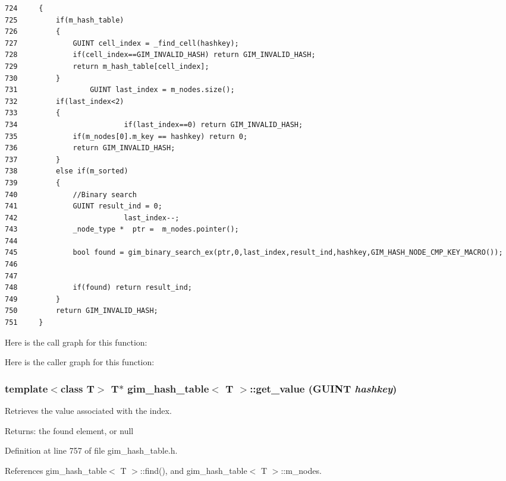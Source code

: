 \begin{Code}\begin{verbatim}724     {
725         if(m_hash_table)
726         {
727             GUINT cell_index = _find_cell(hashkey);
728             if(cell_index==GIM_INVALID_HASH) return GIM_INVALID_HASH;
729             return m_hash_table[cell_index];
730         }
731                 GUINT last_index = m_nodes.size();
732         if(last_index<2)
733         {
734                         if(last_index==0) return GIM_INVALID_HASH;
735             if(m_nodes[0].m_key == hashkey) return 0;
736             return GIM_INVALID_HASH;
737         }
738         else if(m_sorted)
739         {
740             //Binary search
741             GUINT result_ind = 0;
742                         last_index--;
743             _node_type *  ptr =  m_nodes.pointer();
744 
745             bool found = gim_binary_search_ex(ptr,0,last_index,result_ind,hashkey,GIM_HASH_NODE_CMP_KEY_MACRO());
746 
747 
748             if(found) return result_ind;
749         }
750         return GIM_INVALID_HASH;
751     }
\end{verbatim}
\end{Code}




Here is the call graph for this function:

Here is the caller graph for this function:\hypertarget{classgim__hash__table_40b5c46a0117da3948cd1b093f185321}{
\subsubsection[get\_\-value]{\setlength{\rightskip}{0pt plus 5cm}template$<$class T$>$ T$\ast$ {\bf gim\_\-hash\_\-table}$<$ T $>$::get\_\-value (GUINT {\em hashkey})}}
\label{classgim__hash__table_40b5c46a0117da3948cd1b093f185321}


Retrieves the value associated with the index. 

\begin{Desc}
\item[Returns:]the found element, or null \end{Desc}


Definition at line 757 of file gim\_\-hash\_\-table.h.

References gim\_\-hash\_\-table$<$ T $>$::find(), and gim\_\-hash\_\-table$<$ T $>$::m\_\-nodes.

